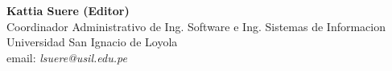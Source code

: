 \begin{center}
\textbf{Kattia Suere (Editor)} \\
Coordinador Administrativo de Ing. Software e Ing. Sistemas de Informacion \\
Universidad San Ignacio de Loyola \\
email: \textit{lsuere@usil.edu.pe} \\
\end{center}

